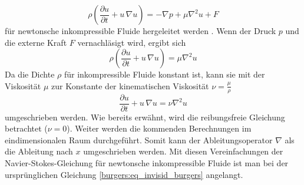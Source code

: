		\begin{equation}
			\rho \left(\frac{\partial u}{\partial t} + u \, \nabla u \right) = -\nabla p + \mu \nabla^2 u + F
			\label{burgers:eq_navier}
		\end{equation}
		 f\"ur newtonsche inkompressible Fluide hergeleitet werden \cite{burgers:navier}.
%
		Wenn der Druck $p$ und die externe Kraft $F$ vernachl\"asigt wird, ergibt sich
		\begin{equation}
			\rho \left(\frac{\partial u}{\partial t} + u \, \nabla u \right) = \mu \nabla^2 u
			 \label{burgers:eq_navier2}
		\end{equation}
		Da die Dichte $\rho$ für inkompressible Fluide konstant ist, kann sie mit der Viskosität $\mu$ zur Konstante der kinematischen Viskosität $\nu = \frac{\mu}{\rho}$
%
%
		\begin{equation}
			 \frac{\partial u}{\partial t} + u \,\nabla u = \nu \nabla^2 u
			 \label{burgers:eq_navier3}
		\end{equation}
		umgeschrieben werden.
		Wie bereits erw\"ahnt, wird die reibungsfreie Gleichung betrachtet ($\nu = 0$).
		Weiter werden die kommenden Berechnungen im eindimensionalen Raum durchgef\"uhrt.
		Somit kann der Ableitungsoperator $\nabla$ als die Ableitung nach $x$ umgeschrieben werden.
		Mit diesen Vereinfachungen der Navier-Stokes-Gleichung f\"ur newtonsche inkompressible Fluide ist man bei der urspr\"unglichen Gleichung \eqref{burgers:eq_invisid_burgers} angelangt.

